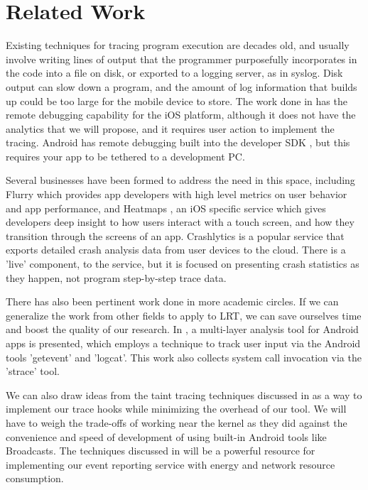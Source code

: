\documentclass{acm_proc_article-sp}
\begin{document}
\section{Related Work} 
Existing techniques for tracing program execution are decades old, and usually 
involve writing lines of output that the programmer purposefully incorporates 
in the code into a file on disk, or exported to a logging server, as in syslog. 
Disk output can slow down a program, and the amount of log information that 
builds up could be too large for the mobile device to store. The work done in 
\cite{NSLogger} has the remote debugging capability for the iOS platform, although 
it does not have the analytics that we will propose, and it requires user action 
to implement the tracing. Android has remote debugging built into the developer 
SDK \cite{AndroidRemoteDebugTool}, but this requires your app to be tethered to a development PC.

Several businesses have been formed to address the need in this space, including
Flurry \cite{Flurry} which provides app developers with high level metrics on
user behavior and app performance, and Heatmaps \cite{Heatmaps}, an iOS specific
service which gives developers deep insight to how users interact with a touch
screen, and how they transition through the screens of an app. 
Crashlytics \cite{Crashlytics} is a popular service that exports detailed
crash analysis data from user devices to the cloud. There is a 'live' component,
to the service, but it is focused on presenting crash statistics as they happen,
not program step-by-step trace data.

There has also been pertinent work done in more academic circles. If we can 
generalize the work from other fields to apply to LRT, we can save ourselves 
time and boost the quality of our research. In \cite{ProfileDroid}, a 
multi-layer analysis tool for Android apps is presented, which employs a 
technique to track user input via the Android tools 'getevent' and 'logcat'. 
This work also collects system call invocation via the 'strace' tool. 

We can also draw ideas from the taint tracing techniques discussed in 
\cite{TaintDroid} as a way to implement our trace hooks while minimizing 
the overhead of our tool. We will have to weigh the trade-offs of working 
near the kernel as they did against the convenience and speed of development 
of using built-in Android tools like Broadcasts.  
The techniques discussed in \cite{PeriodicTransfers} will be a 
powerful resource for implementing our 
event reporting service with energy and network resource consumption.
\end{document}
